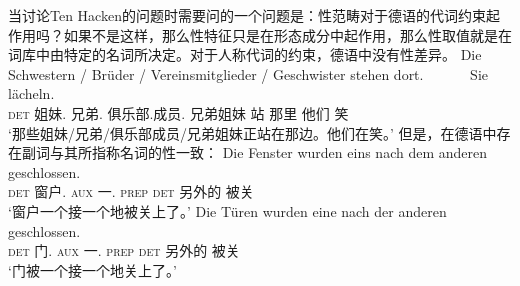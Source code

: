 当讨论Ten Hacken的问题时需要问的一个问题是：性范畴对于德语的代词约束起作用吗？如果不是这样，那么性特征只是在形态成分中起作用，那么性取值就是在词库中由特定的名词所决定。对于人称代词的约束，德语中没有性差异。
\ea
\gll Die Schwestern / Brüder / Vereinsmitglieder / Geschwister stehen dort.~~~~~~ Sie lächeln.\\
     \textsc{det} 姐妹.\fem{} {} 兄弟.\mas{} {} 俱乐部.成员.\neu{} {} 兄弟姐妹 站 那里 他们 笑\\
\glt `那些姐妹/兄弟/俱乐部成员/兄弟姐妹正站在那边。他们在笑。'
\z
但是，在德语中存在副词与其所指称名词的性一致\citep[\S~6]{Hoehle83}：
\eal
\label{Beispiel-einer-nach-dem-anderen}
\ex
\gll Die Fenster wurden eins nach dem anderen geschlossen.\\
	 \textsc{det} 窗户.\neu{}  \textsc{aux} 一.\neu{} \textsc{prep} \textsc{det} 另外的 被关\\
\glt `窗户一个接一个地被关上了。'
\ex 
\gll Die Türen wurden eine nach der anderen geschlossen.\\
	\textsc{det} 门.\fem{} \textsc{aux} 一.\fem{} \textsc{prep} \textsc{det} 另外的 被关\\
\glt `门被一个接一个地关上了。'

